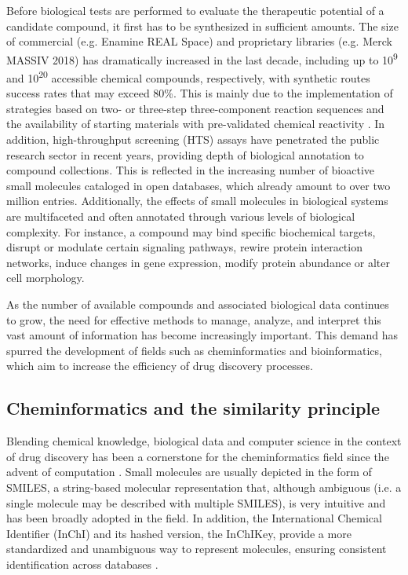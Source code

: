 Before biological tests are performed to evaluate the therapeutic potential of a candidate compound, it first has to be synthesized in sufficient amounts. The size of commercial (e.g. Enamine REAL Space) and proprietary libraries (e.g. Merck MASSIV 2018) has dramatically increased in the last decade, including up to 10\textsuperscript{9} and 10\textsuperscript{20} accessible chemical compounds, respectively, with synthetic routes success rates that may exceed 80\%\cite{stein_virtual_2020, hoffmann_next_2019, klingler_sar_2019}. This is mainly due to the implementation of strategies based on two- or three-step three-component reaction sequences and the availability of starting materials with pre-validated chemical reactivity \cite{grygorenko_generating_2020}. In addition, high-throughput screening (HTS) assays have penetrated the public research sector in recent years, providing depth of biological annotation to compound collections\cite{subramanian_next_2017, corsello_discovering_2020}. This is reflected in the increasing number of bioactive small molecules cataloged in open databases, which already amount to over two million entries\cite{gaulton_chembl_2017, wang_pubchem_2017}. Additionally, the effects of small molecules in biological systems are multifaceted and often annotated through various levels of biological complexity. For instance, a compound may bind specific biochemical targets, disrupt or modulate certain signaling pathways, rewire protein interaction networks, induce changes in gene expression, modify protein abundance or alter cell morphology.

As the number of available compounds and associated biological data continues to grow, the need for effective methods to manage, analyze, and interpret this vast amount of information has become increasingly important. This demand has spurred the development of fields such as cheminformatics and bioinformatics, which aim to increase the efficiency of drug discovery processes. 


\subsection{Cheminformatics and the similarity principle}
\label{Introduction_cheminformatics}

Blending chemical knowledge, biological data and computer science in the context of drug discovery has been a cornerstone for the cheminformatics field since the advent of computation \cite{brown_chemoinformatics_1998, engel_basic_2006}. Small molecules are usually depicted in the form of SMILES, a string-based molecular representation that, although ambiguous (i.e. a single molecule may be described with multiple SMILES), is very intuitive and has been broadly adopted in the field\cite{weininger_smiles_1988}. In addition, the International Chemical Identifier (InChI) and its hashed version, the InChIKey, provide a more standardized and unambiguous way to represent molecules, ensuring consistent identification across databases \cite{heller_inchi_2015}.

